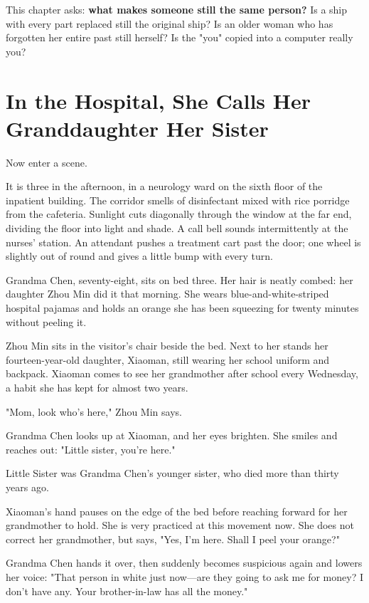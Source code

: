 This chapter asks: \textbf{what makes someone still the same person?} Is a ship with every part replaced still the original ship? Is an older woman who has forgotten her entire past still herself? Is the "you" copied into a computer really you?

\section[A Granddaughter Called a Sister]{In the Hospital, She Calls Her Granddaughter Her Sister}
Now enter a scene.

It is three in the afternoon, in a neurology ward on the sixth floor of the inpatient building. The corridor smells of disinfectant mixed with rice porridge from the cafeteria. Sunlight cuts diagonally through the window at the far end, dividing the floor into light and shade. A call bell sounds intermittently at the nurses' station. An attendant pushes a treatment cart past the door; one wheel is slightly out of round and gives a little bump with every turn.

Grandma Chen, seventy-eight, sits on bed three. Her hair is neatly combed: her daughter Zhou Min did it that morning. She wears blue-and-white-striped hospital pajamas and holds an orange she has been squeezing for twenty minutes without peeling it.

Zhou Min sits in the visitor's chair beside the bed. Next to her stands her fourteen-year-old daughter, Xiaoman, still wearing her school uniform and backpack. Xiaoman comes to see her grandmother after school every Wednesday, a habit she has kept for almost two years.

"Mom, look who's here," Zhou Min says.

Grandma Chen looks up at Xiaoman, and her eyes brighten. She smiles and reaches out: "Little sister, you're here."

Little Sister was Grandma Chen's younger sister, who died more than thirty years ago.

Xiaoman's hand pauses on the edge of the bed before reaching forward for her grandmother to hold. She is very practiced at this movement now. She does not correct her grandmother, but says, "Yes, I'm here. Shall I peel your orange?"

Grandma Chen hands it over, then suddenly becomes suspicious again and lowers her voice: "That person in white just now---are they going to ask me for money? I don't have any. Your brother-in-law has all the money."

